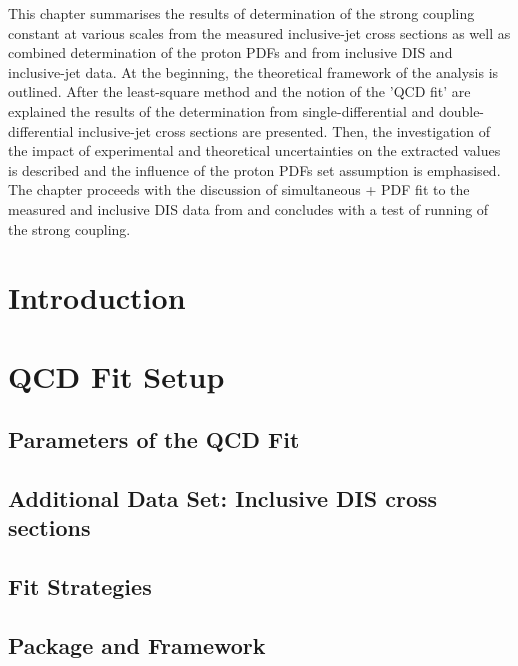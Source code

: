 This chapter summarises the results of determination of the strong coupling constant at various scales from the measured inclusive-jet cross sections as well as combined determination of the proton PDFs and \asz from inclusive DIS and inclusive-jet data. At the beginning, the theoretical framework of the analysis is outlined. After the least-square method and the notion of the 'QCD fit' are explained the results of the \asz determination from single-differential and double-differential inclusive-jet cross sections are presented. Then, the investigation of the impact of experimental and theoretical uncertainties on the extracted \asz values is described and the influence of the proton PDFs set assumption is emphasised. The chapter proceeds with the discussion of simultaneous \as + PDF fit to the measured and inclusive DIS data from \hera and concludes with a test of running of the strong coupling.

\section{Introduction}
\label{sec:qcdfitintro}


\section{QCD Fit Setup}
\label{sec:fitsettings}


\subsection{Parameters of the QCD Fit}
\label{subsec:qcdfitparams}


\subsection{Additional Data Set: Inclusive DIS cross sections}
\label{subsec:inclusivedisdata}


\subsection{Fit Strategies}
\label{subsec:fitstategy}


\subsection{\herafitter Package and \fastnlo Framework}
\label{subsec:herfitter}


